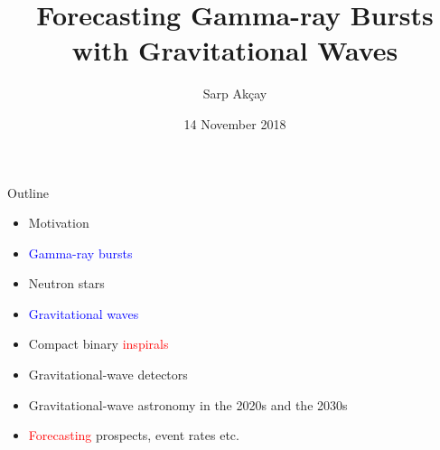 \documentclass[xcolor=dvipsnames,t]{beamer}
\title[] %
\title[Forecasting GRBs with GWs] %
{\vspace{0mm}Forecasting Gamma-ray Bursts with Gravitational Waves}
\subtitle{} %
\author[Sarp Ak\c{c}ay]{\vspace{-2cm}Sarp Ak\c cay\inst{1}\inst{2} }
\institute[FSU Jena - UCD] %
{\vspace{-2.25cm}
  \inst{1}%
  FSU Jena %
  \inst{2}%
  University College Dublin
  }
\date[Sabanc\i~Universitesi]{\vspace{-2.5cm}14 November 2018}
\newcommand{\red}[1]{\textcolor{red}{#1}}
\newcommand{\bl}[1]{\textcolor{blue}{#1}}
\begin{document}
{
  \begin{frame}
  \vspace{-2cm}
    \titlepage
  \end{frame}
} %

\begin{frame}{Outline}
\begin{itemize}
 \item Motivation 
 \item \bl{Gamma-ray bursts}
 \item Neutron stars
 \item \bl{Gravitational waves}
 \item Compact binary \red{inspirals}
 \item Gravitational-wave detectors
 \item Gravitational-wave astronomy in the 2020s and the 2030s
 \item \red{Forecasting} prospects, event rates etc.
\end{itemize}


 
\end{frame}
\end{document}
